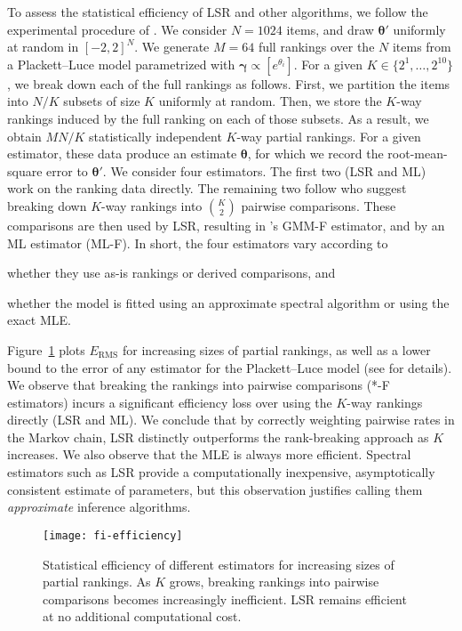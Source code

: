 To assess the statistical efficiency of LSR and other algorithms, we follow the experimental procedure of \citet{hajek2014minimax}.
We consider $N = 1024$ items, and draw $\bm{\theta}'$ uniformly at random in $[-2, 2]^N$.
We generate $M = 64$ full rankings over the $N$ items from a Plackett--Luce model parametrized with $\bm{\gamma} \propto [e^{\theta_i}]$.
For a given $K \in \{2^1, \ldots, 2^{10}\}$, we break down each of the full rankings as follows.
First, we partition the items into $N/K$ subsets of size $K$ uniformly at random.
Then, we store the $K$-way rankings induced by the full ranking on each of those subsets.
As a result, we obtain $MN/K$ statistically independent $K$-way partial rankings.
For a given estimator, these data produce an estimate $\bm{\theta}$, for which we record the root-mean-square error to $\bm{\theta}'$.
We consider four estimators.
The first two (LSR and ML) work on the ranking data directly.
The remaining two follow \citet{azari2013generalized} who suggest breaking down $K$-way rankings into $\binom{K}{2}$ pairwise comparisons.
These comparisons are then used by LSR, resulting in \citeauthor{azari2013generalized}'s GMM-F estimator, and by an ML estimator (ML-F).
In short, the four estimators vary according to
\begin{enuminline}
\item whether they use as-is rankings or derived comparisons, and
\item whether the model is fitted using an approximate spectral algorithm or using the exact MLE.
\end{enuminline}
Figure~\ref{fi:fig:efficiency} plots $E_{\text{RMS}}$ for increasing sizes of partial rankings, as well as a lower bound to the error of any estimator for the Plackett--Luce model (see \citet{hajek2014minimax} for details).
We observe that breaking the rankings into pairwise comparisons (*-F estimators) incurs a significant efficiency loss over using the $K$-way rankings directly (LSR and ML).
We conclude that by correctly weighting pairwise rates in the Markov chain, LSR distinctly outperforms the rank-breaking approach as $K$ increases.
We also observe that the MLE is always more efficient.
Spectral estimators such as LSR provide a computationally inexpensive, asymptotically consistent estimate of parameters, but this observation justifies calling them \emph{approximate} inference algorithms.


\begin{figure}
\centering
\texttt{[image: fi-efficiency]}
\caption{
Statistical efficiency of different estimators for increasing sizes of partial rankings.
As $K$ grows, breaking rankings into pairwise comparisons becomes increasingly inefficient.
LSR remains efficient at no additional computational cost.
}
\label{fi:fig:efficiency}
\end{figure}

